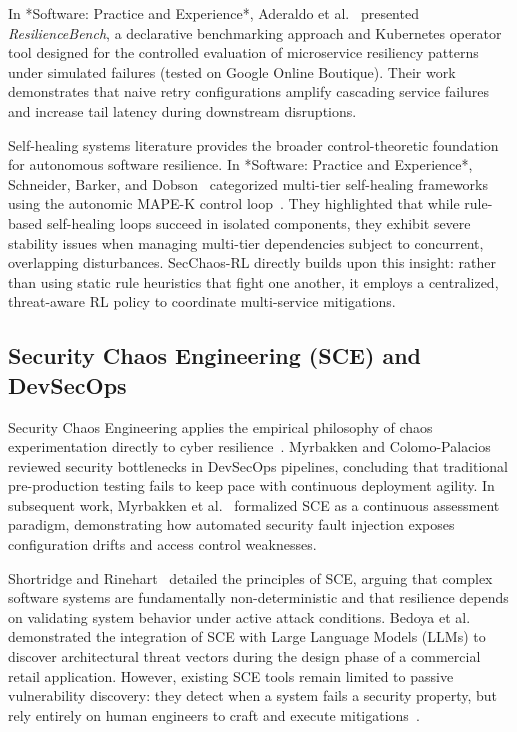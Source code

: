 \documentclass[ASNA,twocolumn]{USG}
\begin{document}
In *Software: Practice and Experience*, Aderaldo et al.~\cite{aderaldo2025declarative} presented \textit{ResilienceBench}, a declarative benchmarking approach and Kubernetes operator tool designed for the controlled evaluation of microservice resiliency patterns under simulated failures (tested on Google Online Boutique). Their work demonstrates that naive retry configurations amplify cascading service failures and increase tail latency during downstream disruptions.

Self-healing systems literature provides the broader control-theoretic foundation for autonomous software resilience. In *Software: Practice and Experience*, Schneider, Barker, and Dobson~\cite{schneider2015survey} categorized multi-tier self-healing frameworks using the autonomic MAPE-K control loop~\cite{garlan2004rainbow, salehie2009self}. They highlighted that while rule-based self-healing loops succeed in isolated components, they exhibit severe stability issues when managing multi-tier dependencies subject to concurrent, overlapping disturbances. SecChaos-RL directly builds upon this insight: rather than using static rule heuristics that fight one another, it employs a centralized, threat-aware RL policy to coordinate multi-service mitigations.

\subsection{Security Chaos Engineering (SCE) and DevSecOps}
Security Chaos Engineering applies the empirical philosophy of chaos experimentation directly to cyber resilience~\cite{shortridge2023security}. Myrbakken and Colomo-Palacios~\cite{myrbakken2020security} reviewed security bottlenecks in DevSecOps pipelines, concluding that traditional pre-production testing fails to keep pace with continuous deployment agility. In subsequent work, Myrbakken et al.~\cite{myrbakken2021security} formalized SCE as a continuous assessment paradigm, demonstrating how automated security fault injection exposes configuration drifts and access control weaknesses.

Shortridge and Rinehart~\cite{shortridge2023security} detailed the principles of SCE, arguing that complex software systems are fundamentally non-deterministic and that resilience depends on validating system behavior under active attack conditions. Bedoya et al.~\cite{bedoya2024enhancing} demonstrated the integration of SCE with Large Language Models (LLMs) to discover architectural threat vectors during the design phase of a commercial retail application. However, existing SCE tools remain limited to passive vulnerability discovery: they detect when a system fails a security property, but rely entirely on human engineers to craft and execute mitigations~\cite{shortridge2023security, owotogbe2025chaos}.
\end{document}
